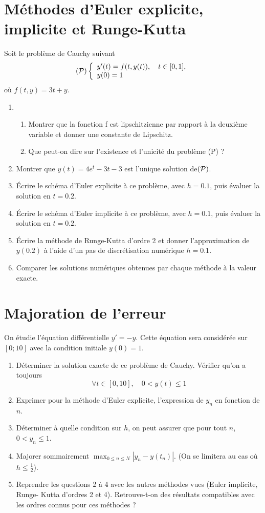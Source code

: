 \documentclass[a4paper]{article}
\begin{document}
\section{Méthodes d'Euler explicite, implicite et Runge-Kutta}
Soit le problème de Cauchy suivant
\[({\cal P})\left\{\begin{array}{l}
y'(t)=f(t,y(t)),\quad t\in [0,1],\\
y(0)=1
\end{array}\right.\]
où $f(t, y) = 3t + y$.
\begin{enumerate}
\item  
\begin{enumerate}
\item  Montrer que la fonction f est lipschitzienne par rapport à la deuxième variable et
donner une constante de Lipschitz.
\item Que peut-on dire sur l'existence et l'unicité du problème (P) ?
\end{enumerate}
\item Montrer que $y(t) = 4e^t - 3t - 3$ est l'unique solution de$({\cal P})$.
\item Écrire le schéma d'Euler explicite à ce problème, avec $h = 0.1$, puis évaluer la solution en $t = 0.2$.
\item Écrire le schéma d'Euler implicite à ce problème, avec $h = 0.1$, puis évaluer la solution en $t = 0.2$.
\item Écrire la méthode de Runge-Kutta d'ordre 2 et donner l'approximation de $y(0.2)$ à l'aide d'un pas de discrétisation numérique $h = 0.1$.
\item  Comparer les solutions numériques obtenues par chaque méthode à la valeur exacte.
\end{enumerate}

\section{Majoration de l'erreur}
 On étudie l'équation différentielle $y' = -y$.
Cette équation sera considérée sur $[0; 10]$ avec la condition initiale $y(0) = 1$.
\begin{enumerate}
\item   Déterminer la solution exacte de ce problème de Cauchy. Vérifier qu'on a toujours
\[\forall t\in [0,10],\quad 0<y(t)\leq 1\]
\item   Exprimer pour la méthode d'Euler explicite, l'expression de $y_n$ en fonction de $n$.
\item  Déterminer à quelle condition sur $h$, on peut assurer que pour tout $n$, $0<y_n\leq 1$. 
\item Majorer sommairement $\max_{0\leq n\leq N}\left|y_n-y(t_n)\right|$. (On se limitera au cas où $h\leq\frac 12$).
\item  Reprendre les questions 2 à 4 avec les autres méthodes vues (Euler implicite, Runge-
Kutta d'ordres 2 et 4). Retrouve-t-on des résultats compatibles avec les ordres connus
pour ces méthodes ?
\end{enumerate}
\end{document}
